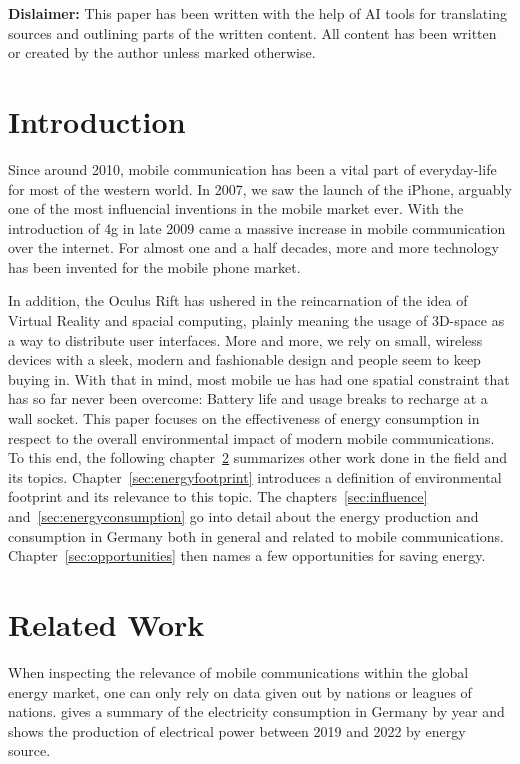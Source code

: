 \documentclass[11pt,a4paper]{article}
\begin{document}
\noindent\textbf{Dislaimer:} This paper has been written with the help of AI tools for translating sources and outlining parts of the written content.
All content has been written or created by the author unless marked otherwise.

\tableofcontents

\section{Introduction}\label{sec:intro}
Since around 2010, mobile communication has been a vital part of everyday-life for most of the western world.
In 2007, we saw the launch of the iPhone, arguably one of the most influencial inventions in the mobile market ever.
With the introduction of \acrfull{4g} in late 2009 came a massive increase in mobile communication over the internet.
For almost one and a half decades, more and more technology has been invented for the mobile phone market.

In addition, the Oculus Rift has ushered in the reincarnation of the idea of Virtual Reality and spacial computing, plainly meaning the usage of 3D-space as a way to distribute user interfaces.
More and more, we rely on small, wireless devices with a sleek, modern and fashionable design and people seem to keep buying in. 
With that in mind, most mobile \acrfull{ue} has had one spatial constraint that has so far never been overcome: Battery life and usage breaks to recharge at a wall socket.
This paper focuses on the effectiveness of energy consumption in respect to the overall environmental impact of modern mobile communications.
To this end, the following chapter~\ref{sec:relatedwork} summarizes other work done in the field and its topics.
Chapter~\ref{sec:energyfootprint} introduces a definition of environmental footprint and its relevance to this topic.
The chapters~\ref{sec:influence} and~\ref{sec:energyconsumption} go into detail about the energy production and consumption in Germany both in general and related to mobile communications.
Chapter~\ref{sec:opportunities} then names a few opportunities for saving energy.

\section{Related Work}\label{sec:relatedwork}

When inspecting the relevance of mobile communications within the global energy market, one can only rely on data given out by nations or leagues of nations.
\citep{Stromverbrauch} gives a summary of the electricity consumption in Germany by year and \citep{Bruttostromerzeugung} shows the production of electrical power between 2019 and 2022 by energy source.
\end{document}
